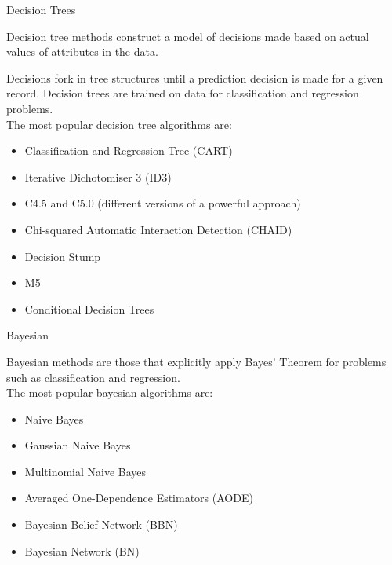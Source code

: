 \documentclass{beamer}
\begin{document}
\begin{frame}{Decision Trees}
\begin{flushleft}
		Decision tree methods construct a model of decisions made based on actual values of attributes in the data.

Decisions fork in tree structures until a prediction decision is made for a given record. Decision trees are trained on data for classification and regression problems.
\\
\vspace{10pt}
	The most popular decision tree algorithms are:
\begin{itemize}
	\item Classification and Regression Tree (CART)
\item Iterative Dichotomiser 3 (ID3)
\item C4.5 and C5.0 (different versions of a powerful approach)
\item Chi-squared Automatic Interaction Detection (CHAID)
\item Decision Stump
\item M5
\item Conditional Decision Trees
\end{itemize}
	\end{flushleft}
\end{frame}

\begin{frame}{Bayesian}
\begin{flushleft}
		Bayesian methods are those that explicitly apply Bayes’ Theorem for problems such as classification and regression.
\\
\vspace{10pt}
	The most popular bayesian algorithms are:
\begin{itemize}
	\item Naive Bayes
\item Gaussian Naive Bayes
\item Multinomial Naive Bayes
\item Averaged One-Dependence Estimators (AODE)
\item Bayesian Belief Network (BBN)
\item Bayesian Network (BN)
\end{itemize}
	\end{flushleft}
\end{frame}
\end{document}
